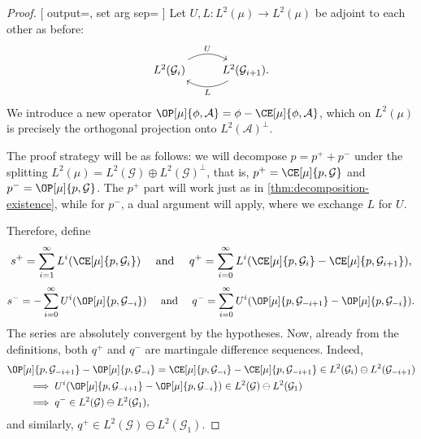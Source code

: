 \documentclass[../main]{subfiles}
\begin{document}
\begin{proof}
  \NewObject{}[
    output=\RandomVariable,
    set arg sep={\where}
  ]
  Let \(U,L \colon L^2(\mu) \to L^2(\mu)\) be adjoint to each other as before:
  \[
    \begin{tikzcd}
      {L^2(\mathcal{G}_i)} & {L^2(\mathcal{G}_{i+1})}
      \arrow["U", bend left, from=1-1, to=1-2]
      \arrow["L", bend left, from=1-2, to=1-1].
    \end{tikzcd}
  \]
  We introduce a new operator \(\OP[\mu]{\phi,\mathcal{A}} = \phi - \CE[\mu]{\phi,\mathcal{A}}\), which on \(L^2(\mu)\) is precisely the orthogonal projection onto \(L^2(\mathcal{A})^{\bot}\).

  The proof strategy will be as follows: we will decompose \(p = p^+ + p^-\) under the splitting \(L^2(\mu) = L^2(\mathcal{G}) \oplus L^2(\mathcal{G})^{\bot}\), that is, \(p^+ = \CE[\mu]{p,\mathcal{G}}\) and \(p^- = \OP[\mu]{p,\mathcal{G}}\). The \(p^+\) part will work just as in \cref{thm:decomposition-existence}, while for \(p^-\), a dual argument will apply, where we exchange \(L\) for \(U\).
  
  Therefore, define
  \begin{equation*}
    s^+ = \sum_{i = 1}^{\infty} L^i(\CE[\mu]{p,\mathcal{G}_i})\quad\text{ and }\quad
    q^+ = \sum_{i = 0}^{\infty} L^i(\CE[\mu]{p,\mathcal{G}_i} - \CE[\mu]{p, \mathcal{G}_{i + 1}}),
  \end{equation*}
  \begin{equation*}
    s^- = - \sum_{i = 0}^{\infty} U^i(\OP[\mu]{p,\mathcal{G}_{-i}})\quad\text{ and }\quad
    q^- = \sum_{i = 0}^{\infty} U^i(\OP[\mu]{p,\mathcal{G}_{-i + 1}} - \OP[\mu]{p, \mathcal{G}_{-i}}).
  \end{equation*}
  The series are absolutely convergent by the hypotheses. Now, already from the definitions, both \(q^+\) and \(q^-\) are martingale difference sequences. Indeed,
  \begin{align*}
    &\OP[\mu]{p,\mathcal{G}_{-i + 1}} - \OP[\mu]{p, \mathcal{G}_{-i}}
      = \CE[\mu]{p,\mathcal{G}_{-i}} - \CE[\mu]{p,\mathcal{G}_{-i + 1}}
      \in L^2(\mathcal{G}_i) \ominus L^2(\mathcal{G}_{-i + 1})\\
    &\qquad\implies
    U^i(\OP[\mu]{p,\mathcal{G}_{-i + 1}} - \OP[\mu]{p, \mathcal{G}_{-i}})
      \in L^2(\mathcal{G}) \ominus L^2(\mathcal{G}_{1})\\
    &\qquad\implies
    q^-
      \in L^2(\mathcal{G}) \ominus L^2(\mathcal{G}_{1}),
  \end{align*}
  and similarly, \(q^+ \in L^2(\mathcal{G}) \ominus L^2(\mathcal{G}_{1})\).


\end{proof}
\end{document}

